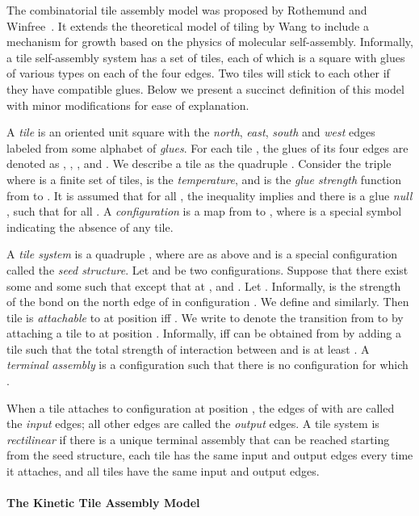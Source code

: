 \documentclass[11pt]{article}
\begin{document}
The combinatorial tile assembly model was proposed by Rothemund and Winfree~\cite{rw00:square1}. It extends the theoretical model of tiling by Wang \cite{w61:tiles} to include a mechanism for growth based on the physics of molecular self-assembly. Informally, a tile self-assembly system has a set of tiles, each of which is a square with glues of various types on each of the four edges. Two tiles will stick to each other if they have compatible glues. Below we present a succinct definition of this model with minor modifications for ease of explanation.

A {\it tile} is an oriented unit square with the {\it north}, {\it east}, {\it south} and {\it west} edges labeled from some alphabet  of {\it glues}. For each tile , the glues of its four edges are denoted as , , , and . We describe a tile  as the quadruple . Consider the triple  where  is a finite set of tiles,  is the {\em temperature}, and  is the {\it glue strength} function from  to . It is assumed that for all , the inequality  implies  and there is a glue {\em null} , such that  for all . A {\em configuration} is a map from  to , where  is a special symbol indicating the absence of any tile.

A {\it tile system} is a quadruple , where  are as above and  is a special configuration called the {\it seed structure}. Let  and  be two configurations. Suppose that there exist some  and some  such that  except that at ,  and . Let . Informally,  is the strength of the bond on the north edge of  in configuration . We define  and  similarly. Then tile  is {\it attachable} to  at position  iff . We write  to denote the transition from  to  by attaching a tile to  at position . Informally,  iff  can be obtained from  by adding a tile  such that the total strength of interaction between  and  is at least . A {\it terminal assembly} is a configuration  such that there is no configuration  for which . 


When a tile  attaches to configuration  at position , the edges  of  with  are called the {\it input} edges; all other edges are called the {\it output} edges. A tile system is {\it rectilinear} if there is a unique terminal assembly that can be reached starting from the seed structure, each tile  has the same input and output edges every time it attaches, and all tiles have the same input and output edges.



\paragraph{The Kinetic Tile Assembly Model}
\label{sec:def_thermo}
\end{document}
